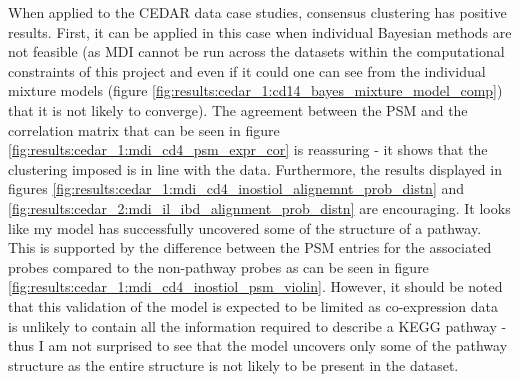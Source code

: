 \documentclass[14pt]{extarticle} %
\begin{document}
	
	When applied to the CEDAR data case studies, consensus clustering has positive results. First, it can be applied in this case when individual Bayesian methods are not feasible (as MDI cannot be run across the datasets within the computational constraints of this project and even if it could one can see from the individual mixture models (figure  \ref{fig:results:cedar_1:cd14_bayes_mixture_model_comp}) that it is not likely to converge). The agreement between the PSM and the correlation matrix that can be seen in figure \ref{fig:results:cedar_1:mdi_cd4_psm_expr_cor} is reassuring - it shows that the clustering imposed is in line with the data. Furthermore, the results displayed in figures \ref{fig:results:cedar_1:mdi_cd4_inostiol_alignemnt_prob_distn} and \ref{fig:results:cedar_2:mdi_il_ibd_alignment_prob_distn} are encouraging. It looks like my model has successfully uncovered some of the structure of a pathway. This is supported by the difference between the PSM entries for the associated probes compared to the non-pathway probes as can be seen in figure \ref{fig:results:cedar_1:mdi_cd4_inostiol_psm_violin}. However, it should be noted that this validation of the model is expected to be limited as co-expression data is unlikely to contain all the information required to describe a KEGG pathway - thus I am not surprised to see that the model uncovers only some of the pathway structure as the entire structure is not likely to be present in the dataset.
	
\end{document}
